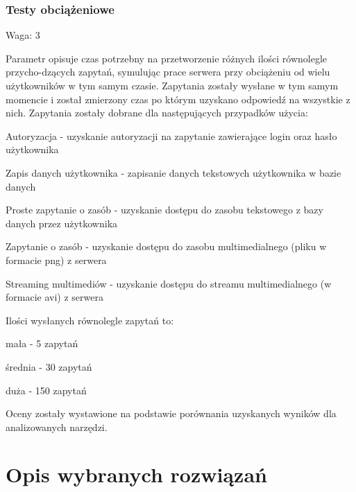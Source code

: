 \documentclass[12pt]{report}
\begin{document}
    \subsection{Testy obciążeniowe}
      \begin{description}
        \item Waga: 3
      \end{description}
      Parametr opisuje czas potrzebny na przetworzenie różnych ilości równolegle przycho-dzących zapytań, symulując prace serwera przy obciążeniu od wielu użytkowników w tym samym czasie.
      Zapytania zostały wysłane w tym samym momencie i został zmierzony czas po którym uzyskano odpowiedź na wszystkie z nich.
      Zapytania zostały dobrane dla następujących przypadków użycia:
      \begin{description}
        \item Autoryzacja - uzyskanie autoryzacji na zapytanie zawierające login oraz hasło użytkownika
        \item Zapis danych użytkownika - zapisanie danych tekstowych użytkownika w bazie danych
        \item Proste zapytanie o zasób - uzyskanie dostępu do zasobu tekstowego z bazy danych przez użytkownika
        \item Zapytanie o zasób - uzyskanie dostępu do zasobu multimedialnego (pliku w formacie png) z serwera
        \item Streaming multimediów - uzyskanie dostępu do streamu multimedialnego (w formacie avi) z serwera
      \end{description}
      Ilości wysłanych równolegle zapytań to:
      \begin{description}
        \item mała - 5 zapytań
        \item średnia - 30 zapytań
        \item duża - 150 zapytań
      \end{description}
      Oceny zostały wystawione na podstawie porównania uzyskanych wyników dla analizowanych narzędzi.

\chapter{Opis wybranych rozwiązań}
\end{document}
